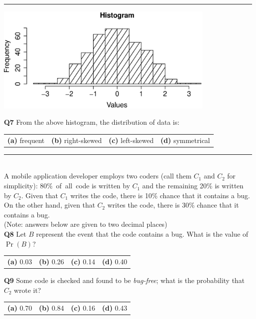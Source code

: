\documentclass[12pt]{article}
\begin{document}
\rule{\linewidth}{1pt}
\begin{center}
\includegraphics[width=0.8\textwidth, trim = 0.0cm 0.6cm 1.5cm 0.8cm, clip]{Hist}
\end{center}
{\bf Q7} From the above histogram, the distribution of data is:\\[0.2cm]
\begin{tabular}{cccc}
{\bf(a)} frequent & {\bf(b)} right-skewed & {\bf(c)} left-skewed & {\bf(d)} symmetrical \\[0.6cm]
\end{tabular}


\rule{\linewidth}{1pt}
\quad\\
A mobile application developer employs two coders (call them $C_1$ and $C_2$ for simplicity): \mbox{80\% of all code} is written by $C_1$ and the remaining 20\% is written by $C_2$. Given that $C_1$ writes the code, there is 10\% chance that it contains a bug. On the other hand, given that $C_2$ writes the code, there is 30\% chance that it contains a bug.\\{\footnotesize(Note: answers below are given to two decimal places)}\\[0.3cm]

{\bf Q8} Let $B$ represent the event that the code contains a bug. What is the value of $\Pr(B)$?\\[0.2cm]
\begin{tabular}{cccc}
{\bf(a)} 0.03 & {\bf(b)} 0.26 & {\bf(c)} 0.14 & {\bf(d)} 0.40 \\[0.6cm]
\end{tabular}

{\bf Q9} Some code is checked and found to be \emph{bug-free}; what is the probability that $C_2$ wrote it?\\[0.2cm]
\begin{tabular}{cccc}
{\bf(a)} 0.70 & {\bf(b)} 0.84 & {\bf(c)}  0.16 & {\bf(d)} 0.43 \\[0.6cm]
\end{tabular}
\end{document}
